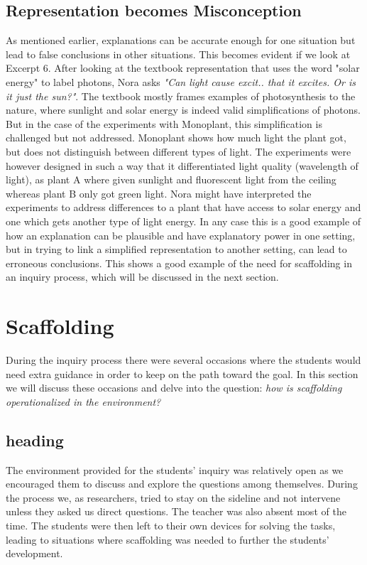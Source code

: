 \subsection{Representation becomes Misconception}
As mentioned earlier, explanations can be accurate enough for one situation but lead to false conclusions in other situations. \citep{smith1994misconceptions} This becomes evident if we look at Excerpt 6. After looking at the textbook representation that uses the word "solar energy" to label photons, Nora asks \emph{"Can light cause excit.. that it excites. Or is it just the sun?"}. The textbook mostly frames examples of photosynthesis to the nature, where sunlight and solar energy is indeed valid simplifications of photons. But in the case of the experiments with Monoplant, this simplification is challenged but not addressed. Monoplant shows how much light the plant got, but does not distinguish between different types of light. The experiments were however designed in such a way that it differentiated light quality (wavelength of light), as plant A where given sunlight and fluorescent light from the ceiling whereas plant B only got green light. Nora might have interpreted the experiments to address differences to a plant that have access to solar energy and one which gets another type of light energy. In any case this is a good example of how an explanation can be plausible and have explanatory power in one setting, but in trying to link a simplified representation to another  setting, can lead to erroneous conclusions. This shows a good example of the need for scaffolding in an inquiry process, which will be discussed in the next section.



\section{Scaffolding}
During the inquiry process there were several occasions where the students would need extra guidance in order to keep on the path toward the goal. In this section we will discuss these occasions and delve into the question: \emph{how is scaffolding operationalized in the environment?}

\subsection{heading}
The environment provided for the students' inquiry was relatively open as we encouraged them to discuss and explore the questions among themselves. During the process we, as researchers, tried to stay on the sideline and not intervene unless they asked us direct questions. The teacher was also absent most of the time. The students were then left to their own devices for solving the tasks, leading to situations where scaffolding was needed to further the students' development. 

